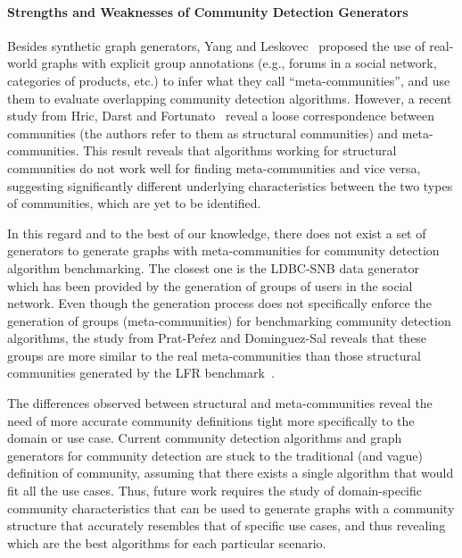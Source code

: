 \paragraph{Strengths and Weaknesses of Community Detection Generators}
Besides synthetic graph generators, Yang and Leskovec~\cite{yang2015defining}
proposed the use of real-world graphs with explicit group annotations (e.g.,
forums in a social network, categories of products, etc.) to infer what they
call ``meta-communities'', and use them to evaluate overlapping community
detection algorithms. However, a recent study from Hric, Darst and
Fortunato~\cite{hric2014community} reveal a loose correspondence between
communities (the authors refer to them as structural communities) and
meta-communities.  This result reveals that  algorithms working for structural
communities do not work well for finding meta-communities and vice versa,
suggesting significantly different underlying characteristics
between the two types of communities, which are yet to be
identified.

In this regard and to the best of our knowledge, there does not exist a set of
generators to generate graphs with meta-communities for community detection
algorithm benchmarking. The closest one is the LDBC-SNB data
generator~\cite{Erling:2015:LSN:2723372.2742786} which has been provided by the
generation of groups of users in the social network. Even though the generation
process does not specifically enforce the generation of groups
(meta-communities) for benchmarking community detection algorithms, the study
from Prat-Pe\'rez and Dominguez-Sal reveals that these groups are more similar
to the real meta-communities than those structural communities generated by the
LFR benchmark~\cite{Prat-Perez:2014:CSS:2621934.2621942}.

The differences observed between structural and meta-communities reveal the need
of more accurate community definitions tight more specifically to the domain or
use case. Current community detection algorithms and graph generators for
community detection are stuck to the traditional (and vague) definition of
community, assuming that there exists a single algorithm that would fit all the
use cases. Thus, future work requires the study of domain-specific community
characteristics that can be used to generate graphs with a community structure
that accurately resembles that of specific use cases, and thus revealing which
are the best algorithms for each particular scenario.

